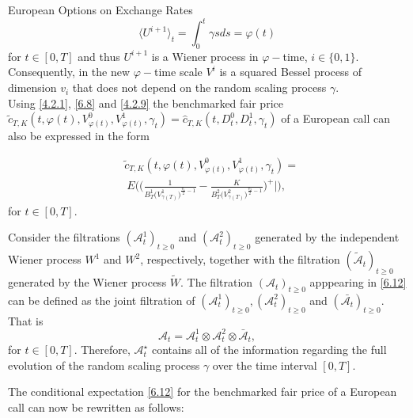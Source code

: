 \documentclass[unknownkeysallowed, compress]{beamer}
\theoremstyle{plain}
\begin{document}
\begin{frame}[allowframebreaks]{European Options on Exchange Rates}
\begin{equation}\label{4.2.11}
\langle U^{i+1}\rangle_t = \int_0^t\gamma sds = \varphi(t)
\end{equation}
for $t\in[0,T]$ and thus $U^{i+1}$ is a Wiener process in $\varphi-$time, $i\in\{0,1\}$. Consequently, in the new $\varphi-$time scale $V^i$ is a squared Bessel  process of dimension $v_i$ that does not depend on the random scaling  process $\gamma$.\\
Using %
 \eqref{4.2.1}, \eqref{6.8} and \eqref{4.2.9} the benchmarked fair price $\tilde{c}_{T,K}(t,\varphi(t), V^0_{\varphi(t)}, V^1_{\varphi(t)},\gamma_t) = \hat{c}_{T,K}(t,D_t^0,D_t^1,\gamma_t)$ of a European call can also be expressed in the form

\begin{equation}\label{6.12}
\begin{split}
& \tilde{c}_{T,K}(t,\varphi(t),V^0_{\varphi(t)},V^1_{\varphi(t)},\gamma_t) = \\
&~E\bigg(\bigg(\frac{1}{B_T^1\bigg(V^1_{\gamma(T)}\bigg)^{\frac{v_1}{2}-1}} - \frac{K}{B_T^2\bigg(V^2_{\gamma(T)}\bigg)^{\frac{v_2}{2}-1}}\bigg)^+\bigg|\bigg), 
\end{split}
\end{equation}
for $t\in[0,T]$.\\
\noindent
\par Consider the filtrations $(\mathcal{A}^1_t)_{t\geq 0}$ and  $(\mathcal{A}^2_t)_{t\geq 0}$ generated by the independent Wiener process $W^1$ and $W^2$, respectively, together with the filtration $(\tilde{\mathcal{A}}_t)_{t\geq 0}$ generated by the Wiener process $\tilde{W}$. The filtration $(\mathcal{A}_t)_{t\geq 0}$ apppearing in \eqref{6.12} can be defined as the joint filtration of $(\mathcal{A}^1_t)_{t\geq 0}, (\mathcal{A}_t^2)_{t\geq 0}$ and $(\bar{\mathcal{A}_t})_{t\geq 0}$. That is
$$
\mathcal{A}_t  = \mathcal{A}_t^1\otimes \mathcal{A}_t^2\otimes\bar{\mathcal{A}}_t,
$$
for $t\in[0,T]$. Therefore, $\mathcal{A}_t^\star$ contains all of the information regarding the full evolution of the random scaling process $\gamma$ over the time interval $[0,T]$.\\
\par The conditional expectation \eqref{6.12} %
for the benchmarked fair price of a European call can now be rewritten as follows:


\end{frame}
\end{document}
